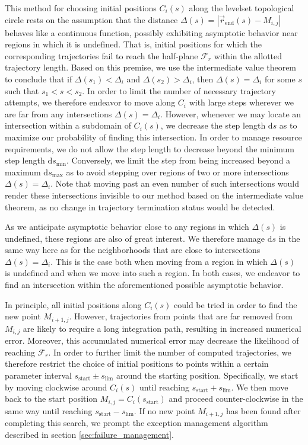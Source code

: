 This method for choosing initial positions $C_i(s)$ along the levelset topological circle rests on the assumption that the distance $\Delta(s)=\left|\vec{r}_{\text{end}}(s)-M_{i,j}\right|$ behaves like a continuous function, possibly exhibiting asymptotic behavior near regions in which it is undefined. That is, initial positions for which the corresponding trajectories fail to reach the half-plane $\mathcal{F}_r$ within the allotted trajectory length. Based on this premise, we use the intermediate value theorem to conclude that if $\Delta(s_1) < \Delta_i$ and $\Delta(s_2) > \Delta_i$, then $\Delta(s) = \Delta_i$ for some $s$ such that $s_1<s<s_2$. In order to limit the number of necessary trajectory attempts, we therefore endeavor to move along $C_i$ with large steps wherever we are far from any intersections $\Delta(s) = \Delta_i$. However, whenever we may locate an intersection within a subdomain of $C_i(s)$, we decrease the step length $\text{d}s$ as to maximize our probability of finding this intersection. In order to manage resource requirements, we do not allow the step length to decrease beyond the minimum step length $\text{d}s_{\text{min}}$. Conversely, we limit the step from being increased beyond a maximum $\text{d}s_{\text{max}}$ as to avoid stepping over regions of two or more intersections $\Delta(s) = \Delta_i$. Note that moving past an even number of such intersections would render these intersections invisible to our method based on the intermediate value theorem, as no change in trajectory termination status would be detected.

As we anticipate asymptotic behavior close to any regions in which $\Delta(s)$ is undefined, these regions are also of great interest. We therefore manage $\text{d}s$ in the same way here as for the neighborhoods that are close to intersections $\Delta(s) = \Delta_i$. This is the case both when moving from a region in which $\Delta(s)$ is undefined and when we move into such a region. In both cases, we endeavor to find an intersection within the aforementioned possible asymptotic behavior.

In principle, all initial positions along $C_i(s)$ could be tried in order to find the new point $M_{i+1,j}$. However, trajectories from points that are far removed from $M_{i,j}$ are likely to require a long integration path, resulting in increased numerical error. Moreover, this accumulated numerical error may decrease the likelihood of reaching $\mathcal{F}_r$. In order to further limit the number of computed trajectories, we therefore restrict the choice of initial positions to points within a certain parameter interval $s_{\text{start}}\pm s_{\text{lim}}$ around the starting position. Specifically, we start by moving clockwise around $C_i(s)$ until reaching $s_{\text{start}}+s_{\text{lim}}$. We then move back to the start position $M_{i,j} = C_i(s_{\text{start}})$ and proceed counter-clockwise in the same way until reaching $s_{\text{start}}-s_{\text{lim}}$. If no new point $M_{i+1,j}$ has been found after completing this search, we prompt the exception management algorithm described in section \ref{sec:failure_management}.

